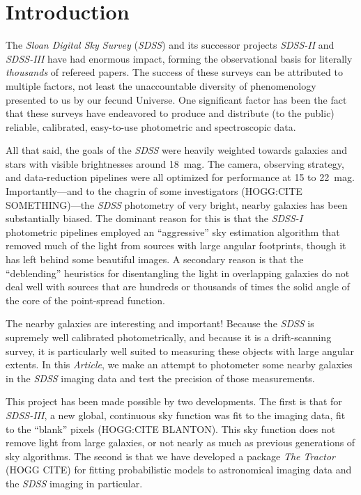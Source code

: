\documentclass[12pt,preprint,pdftex]{aastex}
\newcommand{\project}[1]{\textsl{#1}}
\newcommand{\documentname}{\textsl{Article}}
\begin{document}
\section{Introduction}
The \project{Sloan Digital Sky Survey} (\project{SDSS}) and its
successor projects \project{SDSS-II} and \project{SDSS-III} have had
enormous impact, forming the observational basis for literally
\emph{thousands} of refereed papers.  The success of these surveys can
be attributed to multiple factors, not least the unaccountable
diversity of phenomenology presented to us by our fecund Universe.
One significant factor has been the fact that these surveys have
endeavored to produce and distribute (to the public) reliable,
calibrated, easy-to-use photometric and spectroscopic data.

All that said, the goals of the \project{SDSS} were heavily weighted
towards galaxies and stars with visible brightnesses around 18~mag.
The camera, observing strategy, and data-reduction pipelines were all
optimized for performance at 15 to 22~mag.  Importantly---and to the
chagrin of some investigators (HOGG:CITE SOMETHING)---the \project{SDSS}
photometry of very bright, nearby galaxies has been substantially
biased.  The dominant reason for this is that the \project{SDSS-I}
photometric pipelines employed an ``aggressive'' sky estimation
algorithm that removed much of the light from sources with large
angular footprints, though it has left behind some beautiful images.
A secondary reason is that the ``deblending'' heuristics for
disentangling the light in overlapping galaxies do not deal well with
sources that are hundreds or thousands of times the solid angle of the
core of the point-spread function.

The nearby galaxies are interesting and important!  Because the
\project{SDSS} is supremely well calibrated photometrically, and
because it is a drift-scanning survey, it is particularly well suited
to measuring these objects with large angular extents.  In this
\documentname, we make an attempt to photometer some nearby galaxies
in the \project{SDSS} imaging data and test the precision of those
measurements.

This project has been made possible by two developments.  The first is
that for \project{SDSS-III}, a new global, continuous sky function was
fit to the imaging data, fit to the ``blank'' pixels (HOGG:CITE BLANTON).  This sky
function does not remove light from large galaxies, or not nearly as
much as previous generations of sky algorithms.  The second is that we
have developed a package \project{The Tractor} (HOGG CITE) for fitting
probabilistic models to astronomical imaging data and the
\project{SDSS} imaging in particular.
\end{document}
